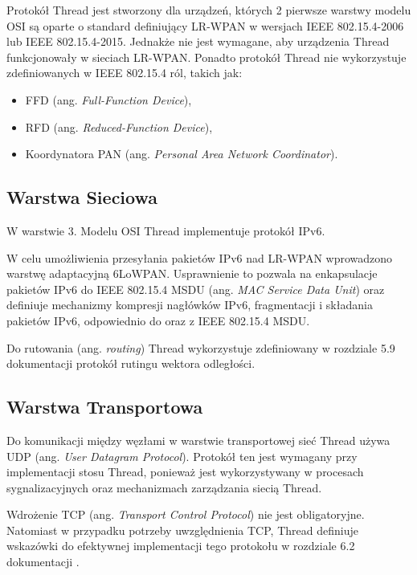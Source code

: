         Protokół Thread jest stworzony dla urządzeń, których 2 pierwsze warstwy modelu OSI są oparte o standard definiujący LR-WPAN w wersjach IEEE 802.15.4-2006 lub IEEE 802.15.4-2015. Jednakże nie jest wymagane, aby urządzenia Thread funkcjonowały w sieciach LR-WPAN. Ponadto protokół Thread nie wykorzystuje zdefiniowanych w IEEE 802.15.4 ról, takich jak:
        \begin{itemize}
            \item FFD (ang. \textit{Full-Function Device}),
            \item RFD (ang. \textit{Reduced-Function Device}),
            \item Koordynatora PAN (ang. \textit{Personal Area Network Coordinator}).
        \end{itemize}

    \subsection{Warstwa Sieciowa}

        W warstwie 3. Modelu OSI Thread implementuje protokół IPv6.
        
        W celu umożliwienia przesyłania pakietów IPv6 nad LR-WPAN wprowadzono warstwę adaptacyjną 6LoWPAN. Usprawnienie to pozwala na enkapsulacje pakietów IPv6 do IEEE 802.15.4 MSDU (ang. \textit{MAC Service Data Unit}) oraz definiuje mechanizmy kompresji nagłówków IPv6, fragmentacji i składania pakietów IPv6, odpowiednio do oraz z IEEE 802.15.4 MSDU.
        
        Do rutowania (ang. \textit{routing}) Thread wykorzystuje zdefiniowany w rozdziale 5.9 dokumentacji \cite{thread-1.3.0} protokół rutingu wektora odległości.

    \subsection{Warstwa Transportowa}
    
        Do komunikacji między węzłami w warstwie transportowej sieć Thread używa UDP (ang. \textit{User Datagram Protocol}). Protokół ten jest wymagany przy implementacji stosu Thread, ponieważ jest wykorzystywany w procesach sygnalizacyjnych oraz mechanizmach zarządzania siecią Thread.
    
        Wdrożenie TCP (ang. \textit{Transport Control Protocol}) nie jest obligatoryjne. Natomiast w przypadku potrzeby uwzględnienia TCP, Thread definiuje wskazówki do efektywnej implementacji tego protokołu w rozdziale 6.2 dokumentacji \cite{thread-1.3.0}.

